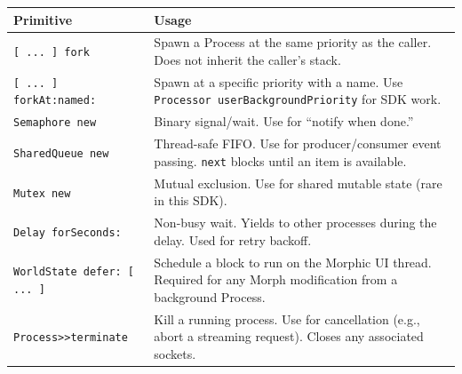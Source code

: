 \documentclass[a4paper,10pt,fleqn]{article}
\begin{document}
\begin{center}
\begin{tabularx}{\linewidth}{@{}lY@{}}
\toprule
\textbf{Primitive} & \textbf{Usage} \\
\midrule
\texttt{[ ... ] fork}  & Spawn a Process at the same priority as the
  caller.  Does not inherit the caller's stack. \\
\texttt{[ ... ] forkAt:named:} & Spawn at a specific priority with a name.
  Use \texttt{Processor userBackgroundPriority} for SDK work. \\
\texttt{Semaphore new}  & Binary signal/wait.  Use for ``notify when
  done.'' \\
\texttt{SharedQueue new} & Thread-safe FIFO.  Use for producer/consumer
  event passing.  \texttt{next} blocks until an item is available. \\
\texttt{Mutex new}      & Mutual exclusion.  Use for shared mutable
  state (rare in this SDK). \\
\texttt{Delay forSeconds:} & Non-busy wait.  Yields to other processes
  during the delay.  Used for retry backoff. \\
\texttt{WorldState defer: [ ... ]} & Schedule a block to run on the
  Morphic UI thread.  Required for any Morph modification from a
  background Process. \\
\texttt{Process>>terminate} & Kill a running process.  Use for
  cancellation (e.g., abort a streaming request).  Closes any
  associated sockets. \\
\bottomrule
\end{tabularx}
\end{center}
\end{document}
